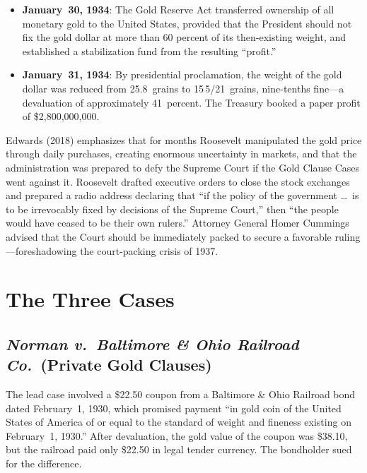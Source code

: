 \documentclass[12pt]{article}
\begin{document}
\begin{itemize}
\item \textbf{January~30, 1934}: The Gold Reserve Act transferred
ownership of all monetary gold to the United States, provided that the
President should not fix the gold dollar at more than 60 percent of its
then-existing weight, and established a stabilization fund from the
resulting ``profit.''

\item \textbf{January~31, 1934}: By presidential proclamation, the
weight of the gold dollar was reduced from 25.8~grains to
15\,5/21~grains, nine-tenths fine---a devaluation of approximately
41~percent. The Treasury booked a paper profit of
\$2,800,000,000.

\end{itemize}

Edwards (2018) emphasizes that for months Roosevelt manipulated the
gold price through daily purchases, creating enormous uncertainty in
markets, and that the administration was prepared to defy the Supreme
Court if the Gold Clause Cases went against it. Roosevelt drafted
executive orders to close the stock exchanges and prepared a radio
address declaring that ``if the policy of the government \ldots\ is to be
irrevocably fixed by decisions of the Supreme Court,'' then ``the people
would have ceased to be their own rulers.'' Attorney General Homer
Cummings advised that the Court should be immediately packed to secure
a favorable ruling---foreshadowing the court-packing crisis of 1937.

\section{The Three Cases}

\subsection{\textit{Norman v.\ Baltimore \& Ohio Railroad Co.}\
(Private Gold Clauses)}

The lead case involved a \$22.50 coupon from a Baltimore \& Ohio Railroad
bond dated February~1, 1930, which promised payment ``in gold coin of
the United States of America of or equal to the standard of weight and
fineness existing on February~1, 1930.'' After devaluation, the gold
value of the coupon was \$38.10, but the railroad paid only \$22.50 in
legal tender currency. The bondholder sued for the difference.
\end{document}
